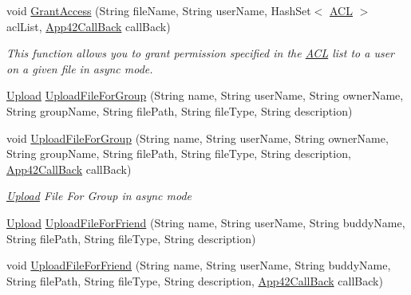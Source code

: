 \begin{DoxyCompactItemize}
void \hyperlink{classcom_1_1shephertz_1_1app42_1_1paas_1_1sdk_1_1csharp_1_1upload_1_1_upload_service_a6afa070d72c9ae64a35ce4349ebf8165}{Grant\+Access} (String file\+Name, String user\+Name, Hash\+Set$<$ \hyperlink{classcom_1_1shephertz_1_1app42_1_1paas_1_1sdk_1_1csharp_1_1_a_c_l}{A\+C\+L} $>$ acl\+List, \hyperlink{interfacecom_1_1shephertz_1_1app42_1_1paas_1_1sdk_1_1csharp_1_1_app42_call_back}{App42\+Call\+Back} call\+Back)
\begin{DoxyCompactList}\small\item\em This function allows you to grant permission specified in the \hyperlink{classcom_1_1shephertz_1_1app42_1_1paas_1_1sdk_1_1csharp_1_1_a_c_l}{A\+C\+L} list to a user on a given file in async mode. \end{DoxyCompactList}\item 
\hyperlink{classcom_1_1shephertz_1_1app42_1_1paas_1_1sdk_1_1csharp_1_1upload_1_1_upload}{Upload} \hyperlink{classcom_1_1shephertz_1_1app42_1_1paas_1_1sdk_1_1csharp_1_1upload_1_1_upload_service_a2a22343400fd54a7080ac789d0e6d370}{Upload\+File\+For\+Group} (String name, String user\+Name, String owner\+Name, String group\+Name, String file\+Path, String file\+Type, String description)
\item 
void \hyperlink{classcom_1_1shephertz_1_1app42_1_1paas_1_1sdk_1_1csharp_1_1upload_1_1_upload_service_a3a036b893dc5d2a94f4816d9d0b754ab}{Upload\+File\+For\+Group} (String name, String user\+Name, String owner\+Name, String group\+Name, String file\+Path, String file\+Type, String description, \hyperlink{interfacecom_1_1shephertz_1_1app42_1_1paas_1_1sdk_1_1csharp_1_1_app42_call_back}{App42\+Call\+Back} call\+Back)
\begin{DoxyCompactList}\small\item\em \hyperlink{classcom_1_1shephertz_1_1app42_1_1paas_1_1sdk_1_1csharp_1_1upload_1_1_upload}{Upload} File For Group in async mode \end{DoxyCompactList}\item 
\hyperlink{classcom_1_1shephertz_1_1app42_1_1paas_1_1sdk_1_1csharp_1_1upload_1_1_upload}{Upload} \hyperlink{classcom_1_1shephertz_1_1app42_1_1paas_1_1sdk_1_1csharp_1_1upload_1_1_upload_service_ab88251595838a7b8fbd9a09752a97bfb}{Upload\+File\+For\+Friend} (String name, String user\+Name, String buddy\+Name, String file\+Path, String file\+Type, String description)
\item 
void \hyperlink{classcom_1_1shephertz_1_1app42_1_1paas_1_1sdk_1_1csharp_1_1upload_1_1_upload_service_af310400bc56e8b179d45e5239cbbe9d9}{Upload\+File\+For\+Friend} (String name, String user\+Name, String buddy\+Name, String file\+Path, String file\+Type, String description, \hyperlink{interfacecom_1_1shephertz_1_1app42_1_1paas_1_1sdk_1_1csharp_1_1_app42_call_back}{App42\+Call\+Back} call\+Back)

\end{DoxyCompactItemize}
